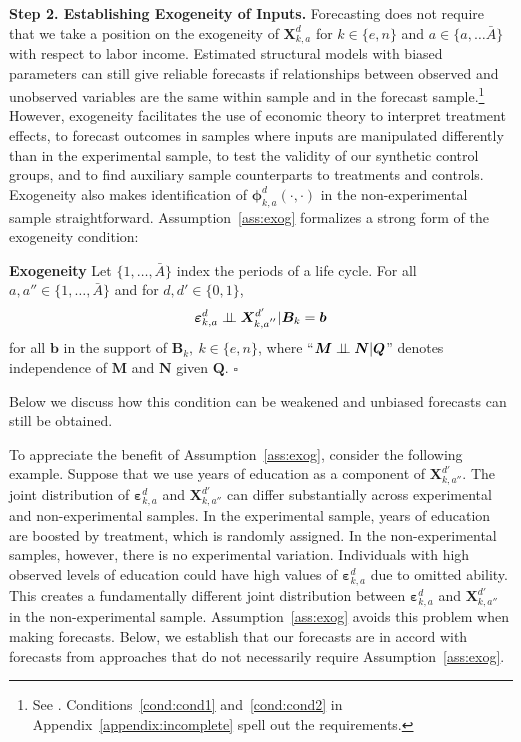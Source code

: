 \begin{figure}
\end{figure}

\textbf{Step 2. Establishing Exogeneity of Inputs.} Forecasting does not require that we take a position on the exogeneity of $\bm{X}^d_{k,a}$ for $k \in \{e,n\}$ and $a \in \{ a, \ldots \bar{A} \}$ with respect to labor income. Estimated structural models with biased parameters can still give reliable forecasts if relationships between observed and unobserved variables are the same within sample and in the forecast sample.\footnote{See \cite{Liu-etal-2016-USC-Data-Models}.  Conditions~\ref{cond:cond1} and~\ref{cond:cond2} in Appendix~\ref{appendix:incomplete} spell out the requirements.} However, exogeneity facilitates the use of economic theory to interpret treatment effects, to forecast outcomes in samples where inputs are manipulated differently than in the experimental sample, to test the validity of our synthetic control groups, and to find auxiliary sample counterparts to treatments and controls. Exogeneity also makes identification of $\bm{\phi}^d_{k,a}\left( \cdot, \cdot \right)$ in the non-experimental sample straightforward. Assumption~\ref{ass:exog} formalizes a strong form of the exogeneity condition:

\onehalfspacing
\begin{assumption}\label{ass:exog} \textbf{Exogeneity}
Let $\{ 1, \ldots, \bar{A} \}$ index the periods of a life cycle. For all $a, a'' \in \{ 1, \ldots, \bar{A} \}$ and for $d, d' \in \{0,1\}$,
\begin{equation}
\bm{\varepsilon}^d_{k,a} \perp\!\!\!\perp \bm{X}^{d^{\prime}}_{k,a^{''}} | \bm{B}_k = \bm{b}
\end{equation}
for all $\bm{b}$ in the support of $\bm{B}_k, \: k \in \{e,n\}$, where ``$\bm{M} \perp\!\!\!\perp \bm{N}|\bm{Q}$'' denotes independence of $\bm{M}$ and $\bm{N}$ given $\bm{Q}$. $\square$
\end{assumption}
\doublespacing
Below we discuss how this condition can be weakened and unbiased forecasts can still be obtained.

To appreciate the benefit of Assumption~\ref{ass:exog}, consider the following example. Suppose that we use years of education as a component of $\bm{X}^{d'}_{k,{a''}}$. The joint distribution of $\bm{\varepsilon}_{k,a}^d$ and $\bm{X}^{d'}_{k,{a''}}$ can differ substantially across experimental and non-experimental samples. In the experimental sample, years of education are boosted by treatment, which is randomly assigned. In the non-experimental samples, however, there is no experimental variation. Individuals with high observed levels of education could have high values of $\bm{\varepsilon}_{k,a}^d$ due to omitted ability. This creates a fundamentally different joint distribution between $\bm{\varepsilon}_{k,a}^d$ and $\bm{X}_{k,{a''}}^{d'}$ in the non-experimental sample. Assumption~\ref{ass:exog} avoids this problem when making forecasts. Below, we establish that our forecasts are in accord with forecasts from approaches that do not necessarily require Assumption~\ref{ass:exog}.


